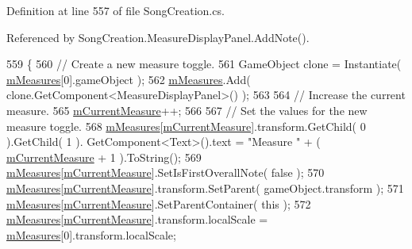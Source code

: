Definition at line 557 of file Song\+Creation.\+cs.



Referenced by Song\+Creation.\+Measure\+Display\+Panel.\+Add\+Note().


\begin{DoxyCode}
559         \{
560             \textcolor{comment}{// Create a new measure toggle.}
561             GameObject clone = Instantiate( \hyperlink{class_song_creation_1_1_note_display_container_a19c1c32db579c642fbc1b5bce0c80e7a}{mMeasures}[0].gameObject );
562             \hyperlink{class_song_creation_1_1_note_display_container_a19c1c32db579c642fbc1b5bce0c80e7a}{mMeasures}.Add( clone.GetComponent<MeasureDisplayPanel>() );
563 
564             \textcolor{comment}{// Increase the current measure.}
565             \hyperlink{class_song_creation_1_1_note_display_container_ad63614e1c51c2db44cfc0fc21704c4ff}{mCurrentMeasure}++;
566 
567             \textcolor{comment}{// Set the values for the new measure toggle.}
568             \hyperlink{class_song_creation_1_1_note_display_container_a19c1c32db579c642fbc1b5bce0c80e7a}{mMeasures}[\hyperlink{class_song_creation_1_1_note_display_container_ad63614e1c51c2db44cfc0fc21704c4ff}{mCurrentMeasure}].transform.GetChild( 0 ).GetChild( 1 ).
      GetComponent<Text>().text = \textcolor{stringliteral}{"Measure "} + ( \hyperlink{class_song_creation_1_1_note_display_container_ad63614e1c51c2db44cfc0fc21704c4ff}{mCurrentMeasure} + 1 ).ToString();
569             \hyperlink{class_song_creation_1_1_note_display_container_a19c1c32db579c642fbc1b5bce0c80e7a}{mMeasures}[\hyperlink{class_song_creation_1_1_note_display_container_ad63614e1c51c2db44cfc0fc21704c4ff}{mCurrentMeasure}].SetIsFirstOverallNote( \textcolor{keyword}{false} );
570             \hyperlink{class_song_creation_1_1_note_display_container_a19c1c32db579c642fbc1b5bce0c80e7a}{mMeasures}[\hyperlink{class_song_creation_1_1_note_display_container_ad63614e1c51c2db44cfc0fc21704c4ff}{mCurrentMeasure}].transform.SetParent( gameObject.transform );
571             \hyperlink{class_song_creation_1_1_note_display_container_a19c1c32db579c642fbc1b5bce0c80e7a}{mMeasures}[\hyperlink{class_song_creation_1_1_note_display_container_ad63614e1c51c2db44cfc0fc21704c4ff}{mCurrentMeasure}].SetParentContainer( \textcolor{keyword}{this} );
572             \hyperlink{class_song_creation_1_1_note_display_container_a19c1c32db579c642fbc1b5bce0c80e7a}{mMeasures}[\hyperlink{class_song_creation_1_1_note_display_container_ad63614e1c51c2db44cfc0fc21704c4ff}{mCurrentMeasure}].transform.localScale = 
      \hyperlink{class_song_creation_1_1_note_display_container_a19c1c32db579c642fbc1b5bce0c80e7a}{mMeasures}[0].transform.localScale;

\end{DoxyCode}
